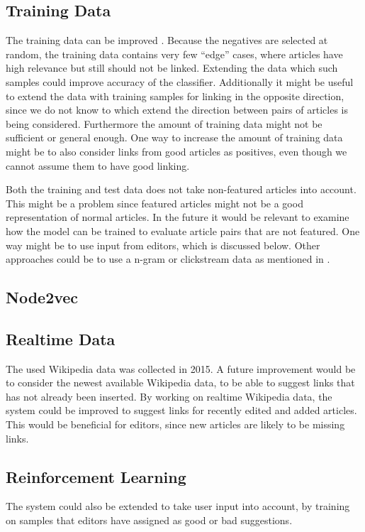 \subsection{Training Data}
The training data can be improved . Because the negatives are selected at random, the training data contains very few \enquote{edge} cases, where articles have high relevance but still should not be linked. Extending the data which such samples could improve accuracy of the classifier. Additionally it might be useful to extend the data with training samples for linking in the opposite direction, since we do not know to which extend the direction between pairs of articles is being considered.
Furthermore the amount of training data might not be sufficient or general enough. One way to increase the amount of training data might be to also consider links from good articles as positives, even though we cannot assume them to have good linking.

Both the training and test data does not take non-featured articles into account. This might be a problem since featured articles might not be a good representation of normal articles. In the future it would be relevant to examine how the model can be trained to evaluate article pairs that are not featured. One way might be to use input from editors, which is discussed below. Other approaches could be to use a n-gram or clickstream data as mentioned in .

\subsection{Node2vec}

\subsection{Realtime Data}
The used Wikipedia data was collected in 2015. A future improvement would be to consider the newest available Wikipedia data, to be able to suggest links that has not already been inserted.
By working on realtime Wikipedia data, the system could be improved to suggest links for recently edited and added articles. This would be beneficial for editors, since new articles are likely to be missing links.

\subsection{Reinforcement Learning}
The system could also be extended to take user input into account, by training on samples that editors have assigned as good or bad suggestions.

